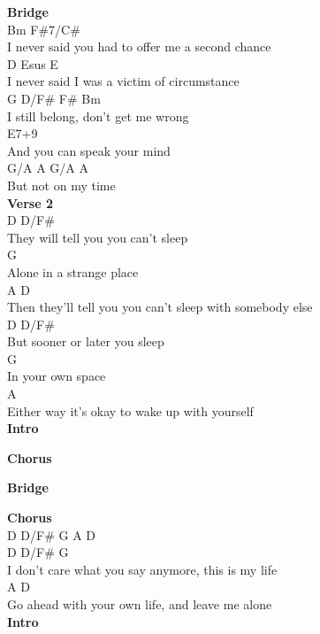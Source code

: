 \documentclass[a4paper]{article}
\begin{document}
{{        }
        \textbf{Bridge}
        ~\\
        {
            \cutive
            \obeyspaces
Bm                                  F\#7/C\#
\\
I never said you had to offer me a second chance
\\
D                                Esus            E
\\
I never said I was a victim of circumstance
\\
G         D/F\#   F\#            Bm
\\
I still belong,     don't get me wrong
\\
E7+9
\\
 And you can speak your mind
\\
    G/A   A   G/A  A
\\
But not   on  my   time
\\

        }
        \textbf{Verse 2}
        ~\\
        {
            \cutive
            \obeyspaces
D                  D/F\#
\\
They will tell you you can't sleep
\\
                G
\\
Alone in a strange place
\\
A                                                   D
\\
Then they'll tell you you can't sleep with somebody else
\\
D                           D/F\#
\\
But sooner or later you sleep
\\
        G
\\
In your own space
\\
A
\\
Either way it's okay to wake up with yourself
\\

        }
        \textbf{Intro}
        ~\\
        {
            \cutive
            \obeyspaces

        }
        \textbf{Chorus}
        ~\\
        {
            \cutive
            \obeyspaces

        }
        \textbf{Bridge}
        ~\\
        {
            \cutive
            \obeyspaces

        }
        \textbf{Chorus}
        ~\\
        {
            \cutive
            \obeyspaces
D    D/F\#    G    A    D
\\
D                     D/F\#                 G
\\
I don't care what you say anymore, this is my life
\\
A                                            D
\\
Go ahead with your own life, and leave me alone
\\

        }
        \textbf{Intro}
        ~\\
        {
            \cutive
            \obeyspaces

        }
    }
\end{document}

